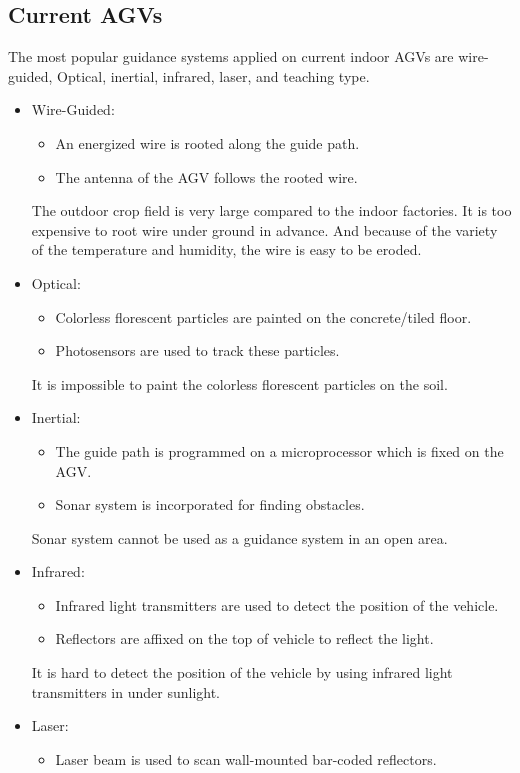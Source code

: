 \documentclass[12pt]{article}
\begin{document}
\begin{flushleft}
\subsection{Current AGVs}
The most popular guidance systems applied on current indoor AGVs are wire-guided, Optical, inertial, infrared, laser, and teaching type. \cite{KESH}
\begin{itemize}
	\item Wire-Guided:
	\begin{itemize}
		\item An energized wire is rooted along the guide path. 
		\item The antenna of the AGV follows the rooted wire.
	\end{itemize}
	The outdoor crop field is very large compared to the indoor factories. It is too expensive to root wire under ground in advance. And because of the variety of the temperature and humidity, the wire is easy to be eroded.
	\item Optical:
	\begin{itemize}
		\item Colorless florescent particles are painted on the concrete/tiled floor. 
		\item Photosensors are used to track these particles.
	\end{itemize}
	It is impossible to paint the colorless florescent particles on the soil.
	\item Inertial:
	\begin{itemize}
		\item The guide path is programmed on a microprocessor which is fixed on the AGV. 
		\item Sonar system is incorporated for finding obstacles.
	\end{itemize}
	Sonar system cannot be used as a guidance system in an open area.
	\item Infrared:
	\begin{itemize}
		\item Infrared light transmitters are used to detect the position of the vehicle.
		\item Reflectors are affixed on the top of vehicle to reflect the light.
	\end{itemize}
	It is hard to detect the position of the vehicle by using infrared light transmitters in under sunlight.
	\item Laser:
	\begin{itemize}
		\item Laser beam is used to scan wall-mounted bar-coded reflectors.

\end{itemize}
\end{itemize}
\end{flushleft}
\end{document}
